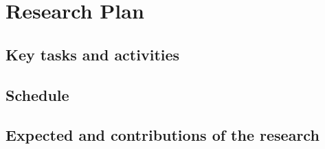 \chapter{Research Plan}

\section{Key tasks and activities}

\section{Schedule}

\section{Expected and contributions of the research}